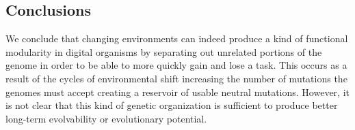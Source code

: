 \subsection{Conclusions}
We conclude that changing environments can indeed produce a kind of functional modularity in digital organisms by separating out unrelated portions of the genome in order to be able to more quickly gain and lose a task. This occurs as a result of the cycles of environmental shift increasing the number of mutations the genomes must accept creating a reservoir of usable neutral mutations. However, it is not clear that this kind of genetic organization is sufficient to produce better long-term evolvability or evolutionary potential.
